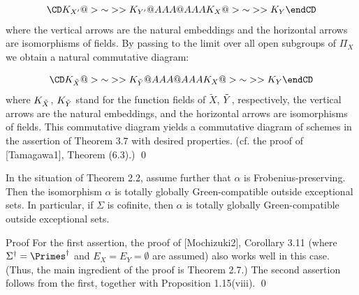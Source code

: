 $$
\CD
K_{X'} @>{\sim}>> K_{Y'}\\
@AAA                        @AAA  \\
K_X @>{\sim}>>  K_Y\\
\endCD
$$
where the vertical arrows are the natural embeddings and the horizontal arrows are 
isomorphisms of fields. By passing to the limit over all 
open subgroups of $\Pi_X$ we obtain a 
natural commutative diagram:

$$
\CD
K_{\Tilde X} @>{\sim}>> K_{\Tilde Y}\\
@AAA                        @AAA  \\
K_X @>{\sim}>>  K_Y\\
\endCD
$$
where $K_{\Tilde X}$, $K_{\Tilde Y}$ stand for
the function fields of $\tilde X$, $\Tilde Y$, respectively,  
the vertical arrows are the natural embeddings, and the horizontal arrows 
are isomorphisms of fields. This commutative diagram yields a 
commutative diagram of schemes in the assertion of Theorem 3.7 
with desired properties. (cf. the proof of [Tamagawa1], Theorem (6.3).) 
\qed
\enddemo

In the situation of Theorem 2.2, assume further that 
$\alpha$ is Frobenius-preserving. 
Then the isomorphism $\alpha$ is totally globally Green-compatible 
outside exceptional sets. In particular, if $\Sigma$ is cofinite, 
then $\alpha$ is totally globally Green-compatible 
outside exceptional sets. 
\endproclaim

\demo
{Proof} For the first assertion, 
the proof of [Mochizuki2], Corollary 3.11 (where 
$\Sigma^{\dag}=\Primes^{\dag}$ and $E_X=E_Y=\emptyset$ are assumed)  
also works well in this case. 
(Thus, the main ingredient of the proof is Theorem 2.7.) 
The second assertion follows from the first, together with 
Proposition 1.15(viii). 
\qed
\enddemo

